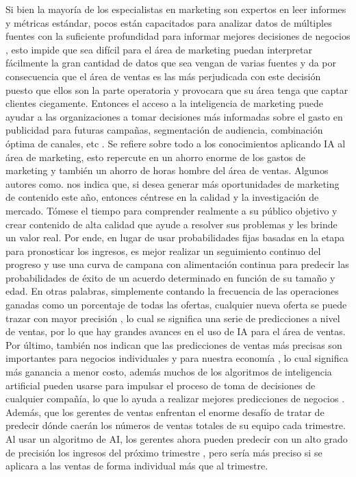\documentclass[conference]{IEEEtran}
\begin{document}
Si bien la mayoría de los especialistas en marketing son expertos en leer informes y métricas estándar, pocos están capacitados para analizar datos 
de múltiples fuentes con la suficiente profundidad para informar mejores decisiones de negocios \cite{b17} , esto impide que sea difícil para el 
área de marketing puedan interpretar fácilmente la gran cantidad de datos que sea vengan de varias fuentes y da por consecuencia que el área de 
ventas es las más perjudicada con este decisión puesto que ellos son la parte operatoria y provocara que su área tenga que captar clientes 
ciegamente. Entonces el acceso a la inteligencia de marketing puede ayudar a las organizaciones a tomar decisiones más informadas sobre el 
gasto en publicidad para futuras campañas, segmentación de audiencia, combinación óptima de canales, etc \cite{b17}. Se refiere sobre todo a los 
conocimientos aplicando IA al área de marketing, esto repercute en un ahorro enorme de los gastos de marketing y también un ahorro de horas hombre 
del área de ventas. Algunos autores como. \cite{b18} nos indica que, si desea generar más oportunidades de marketing de contenido este año, entonces 
céntrese en la calidad y la investigación de mercado. Tómese el tiempo para comprender realmente a su público objetivo y crear contenido de alta 
calidad que ayude a resolver sus problemas y les brinde un valor real. Por ende, en lugar de usar probabilidades fijas basadas en la etapa para 
pronosticar los ingresos, es mejor realizar un seguimiento continuo del progreso y use una curva de campana con alimentación continua para predecir 
las probabilidades de éxito de un acuerdo determinado en función de su tamaño y edad. En otras palabras, simplemente contando la frecuencia de las 
operaciones ganadas como un porcentaje de todas las ofertas, cualquier nueva oferta se puede trazar con mayor precisión \cite{b16}, lo cual se 
significa una serie de predicciones a nivel de ventas, por lo que hay grandes avances en el uso de IA para el área de ventas.\\

Por último, también nos indican que las predicciones de ventas más precisas son importantes para negocios individuales y para nuestra economía 
\cite{b16}, lo cual significa más ganancia a menor costo, además muchos de los algoritmos de inteligencia artificial pueden usarse para impulsar 
el proceso de toma de decisiones de cualquier compañía, lo que lo ayuda a realizar mejores predicciones de negocios \cite{b19}. Además, que los 
gerentes de ventas enfrentan el enorme desafío de tratar de predecir dónde caerán los números de ventas totales de su equipo cada trimestre. 
Al usar un algoritmo de AI, los gerentes ahora pueden predecir con un alto grado de precisión los ingresos del próximo trimestre \cite{b19}, 
pero sería más preciso si se aplicara a las ventas de forma individual más que al trimestre.\\
\end{document}
